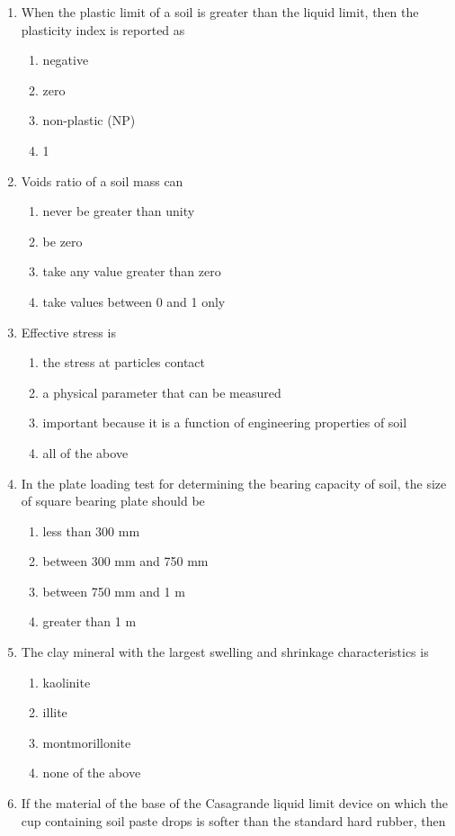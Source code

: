 \documentclass[11pt,a4paper]{article}
\begin{document}
\begin{enumerate}
\item{When the plastic limit of a soil is greater than the liquid limit, then the plasticity index is reported as}
\begin{enumerate}[label=\Alph*.]
\item{negative}
\item{zero}
\item{non-plastic (NP)}
\item{1}
\end{enumerate}
\item{Voids ratio of a soil mass can}
\begin{enumerate}[label=\Alph*.]
\item{never be greater than unity}
\item{be zero}
\item{take any value greater than zero}
\item{take values between 0 and 1 only}
\end{enumerate}
\item{Effective stress is}
\begin{enumerate}[label=\Alph*.]
\item{the stress at particles contact}
\item{a physical parameter that can be measured}
\item{important because it is a function of engineering properties of soil}
\item{all of the above}
\end{enumerate}
\item{In the plate loading test for determining the bearing capacity of soil, the size of square bearing plate should be}
\begin{enumerate}[label=\Alph*.]
\item{less than 300 mm}
\item{between 300 mm and 750 mm}
\item{between 750 mm and 1 m}
\item{greater than 1 m}
\end{enumerate}
\item{The clay mineral with the largest swelling and shrinkage characteristics is}
\begin{enumerate}[label=\Alph*.]
\item{kaolinite}
\item{illite}
\item{montmorillonite}
\item{none of the above}
\end{enumerate}
\item{If the material of the base of the Casagrande liquid limit device on which the cup containing soil paste drops is softer than the standard hard rubber, then}

\end{enumerate}
\end{document}
